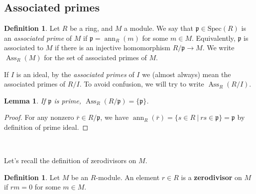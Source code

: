 \documentclass{amsart}[12pt]
\def\Ass{\operatorname{Ass}}
\def\ann{\operatorname{ann}}
\newcommand{\p}{{\mathfrak p}}
\numberwithin{equation}{section}
\theoremstyle{plain} %
\newtheorem{lemma}[equation]{Lemma}
\theoremstyle{definition}
\newtheorem{definition}[equation]{Definition}
\theoremstyle{remark}
\newcommand{\ssec}[1]{\subsection{#1}}
\newcommand{\Spec}{\mathrm{Spec}}
\begin{document}
\ssec{Associated primes}

\begin{definition}
	Let $R$ be a ring, and $M$ a module. We say that $\p\in \Spec(R)$ is an {\em associated prime} of $M$ if $\p = \ann_R(m)$ for some $m\in M$. Equivalently, $\p$ is associated to $M$ if there is an injective homomorphism $R/\p \longrightarrow M$. We write $\Ass_R(M)$\index{$\Ass_R(M)$} for the set of associated primes of $M$.
	
	If $I$ is an ideal, by the {\em associated primes} of $I$ we (almost always) mean the associated primes of $R/I$. To avoid confusion, we will try to write $\Ass_R(R/I)$.
\end{definition}

\begin{lemma}
	If $\p$ is prime, $\Ass_R(R/\p)=\{ \p \}$.
\end{lemma}

\begin{proof}
	For any nonzero $\bar{r}\in R/\p$, we have $\ann_R(\bar{r}) = \{ s\in R \ | \ rs\in \p\} = \p$ by definition of prime ideal.
\end{proof}

\

Let's recall the definition of zerodivisors on $M$.

\begin{definition}
	Let $M$ be an $R$-module. An element $r \in R$ is a {\bf zerodivisor} on $M$ if $rm = 0$ for some $m \in M$. 
\end{definition}
\end{document}
